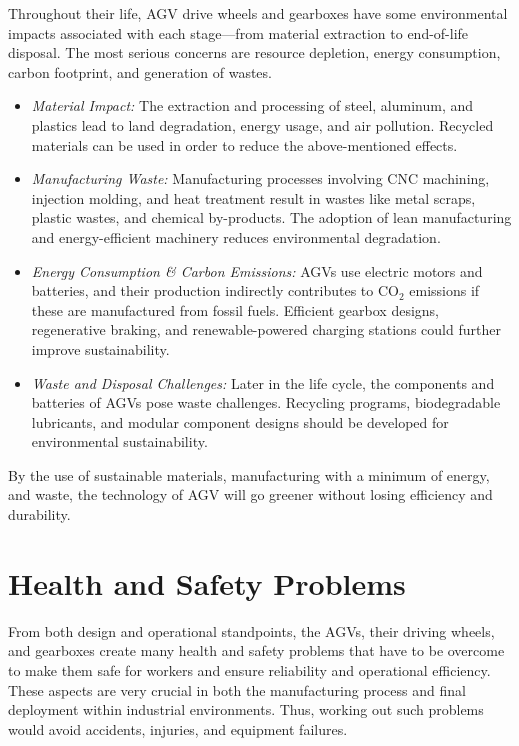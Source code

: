 \documentclass[../../main]{subfiles}
\begin{document}
Throughout their life, AGV drive wheels and gearboxes have some environmental impacts associated with each stage---from material extraction to end-of-life disposal. The most serious concerns are resource depletion, energy consumption, carbon footprint, and generation of wastes.

\begin{itemize}
    \item \textit{Material Impact:} The extraction and processing of steel, aluminum, and plastics lead to land degradation, energy usage, and air pollution. Recycled materials can be used in order to reduce the above-mentioned effects.
    
    \item \textit{Manufacturing Waste:} Manufacturing processes involving CNC machining, injection molding, and heat treatment result in wastes like metal scraps, plastic wastes, and chemical by-products. The adoption of lean manufacturing and energy-efficient machinery reduces environmental degradation.
    
    \item \textit{Energy Consumption \& Carbon Emissions:} AGVs use electric motors and batteries, and their production indirectly contributes to CO\(_2\) emissions if these are manufactured from fossil fuels. Efficient gearbox designs, regenerative braking, and renewable-powered charging stations could further improve sustainability.
    
    \item \textit{Waste and Disposal Challenges:} Later in the life cycle, the components and batteries of AGVs pose waste challenges. Recycling programs, biodegradable lubricants, and modular component designs should be developed for environmental sustainability.
\end{itemize}

By the use of sustainable materials, manufacturing with a minimum of energy, and waste, the technology of AGV will go greener without losing efficiency and durability.

\newpage
\section{Health and Safety Problems}

From both design and operational standpoints, the AGVs, their driving wheels, and gearboxes create many health and safety problems that have to be overcome to make them safe for workers and ensure reliability and operational efficiency. These aspects are very crucial in both the manufacturing process and final deployment within industrial environments. Thus, working out such problems would avoid accidents, injuries, and equipment failures.
\end{document}
